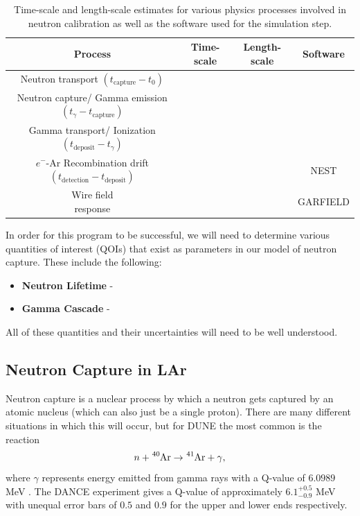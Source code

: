 \documentclass[8pt]{refart}
\begin{document}
\begin{table}[H]
    \centering
    \begin{tabular}{|c|c|c|c|}
    \hline
    Process & Time-scale & Length-scale & Software\\
    \hline
    \hline
    \makecell{Neutron transport\\$(t_{\mathrm{capture}} - t_0)$} & &  &\\
    \hline
    \makecell{Neutron capture/ \\Gamma emission\\ $(t_{\gamma} - t_{\mathrm{capture}})$} & & &\\
    \hline
    \makecell{Gamma transport/\\ Ionization\\$(t_{\mathrm{deposit}} - t_{\gamma})$} & & &\\
    \hline
    \makecell{$e^-$-Ar Recombination\\drift\\$(t_{\mathrm{detection}} - t_{\mathrm{deposit}})$} & & & NEST\\
    \hline
    \makecell{Wire field\\response} & & & GARFIELD\\
    \hline
    \end{tabular}
    \caption{Time-scale and length-scale estimates for various physics processes involved in neutron calibration as well as the software used for the simulation step.}
    \label{tab:my_label}
\end{table}

In order for this program to be successful, we will need to determine various quantities of interest (QOIs) that exist as parameters in our model of neutron capture.  These include the following:
\begin{itemize}
    \item \textbf{Neutron Lifetime} - 
    \item \textbf{Gamma Cascade} - 
\end{itemize}

All of these quantities and their uncertainties will need to be well understood.

\subsection{Neutron Capture in LAr}
Neutron capture is a nuclear process by which a neutron gets captured by an atomic nucleus (which can also just be a single proton).  There are many different situations in which this will occur, but for DUNE the most common is the reaction
\begin{equation}
    n + \ce{^{40}\mathrm{Ar}} \rightarrow \ce{^{41}\mathrm{Ar}} + \gamma,
\end{equation}
where $\gamma$ represents energy emitted from gamma rays with a Q-value of $6.0989$ MeV \cite{DANCE}.  The DANCE experiment gives a Q-value of approximately ${6.1}^{+0.5}_{-0.9}$ MeV with unequal error bars of $0.5$ and $0.9$ for the upper and lower ends respectively.
\end{document}
